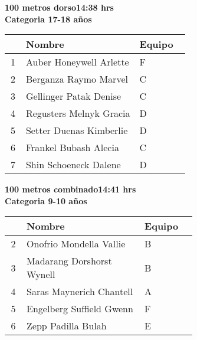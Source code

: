 \begin{minipage}{0.95\linewidth}\vspace{0.5cm} 
\begin{flushleft}
\textbf{
\hspace{-0.15cm}100 metros dorso\hspace{1.5cm}14:38 hrs \\Categoria 17-18 años}\vspace{-0.2cm} 
\end{flushleft}
\begin{tabular}{cp{0.63\linewidth}l}
\hline
& \textbf{Nombre} & \textbf{Equipo} \\ \hline
1 & Auber Honeywell Arlette & F \\ 
2 & Berganza Raymo Marvel & C \\ 
3 & Gellinger Patak Denise & C \\ 
4 & Regusters Melnyk Gracia & D \\ 
5 & Setter Duenas Kimberlie & D \\ 
6 & Frankel Bubash Alecia & C \\ 
7 & Shin Schoeneck Dalene & D \\ 
\end{tabular}
\end{minipage}
\begin{minipage}{0.95\linewidth}\vspace{0.5cm} 
\begin{flushleft}
\textbf{
\hspace{-0.15cm}100 metros combinado\hspace{1.5cm}14:41 hrs \\Categoria 9-10 años}\vspace{-0.2cm} 
\end{flushleft}
\begin{tabular}{cp{0.63\linewidth}l}
\hline
& \textbf{Nombre} & \textbf{Equipo} \\ \hline
2 & Onofrio Mondella Vallie & B \\ 
3 & Madarang Dorshorst Wynell & B \\ 
4 & Saras Maynerich Chantell & A \\ 
5 & Engelberg Suffield Gwenn & F \\ 
6 & Zepp Padilla Bulah & E \\ 
\end{tabular}
\end{minipage}
